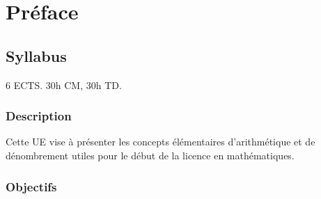 
\chapter*{Préface}


\section*{Syllabus}

6 ECTS. 30h CM, 30h TD.

\subsection*{Description}

Cette UE vise à présenter les concepts élémentaires d'arithmétique et de dénombrement utiles pour le début de la licence en mathématiques.

\subsection*{Objectifs}

